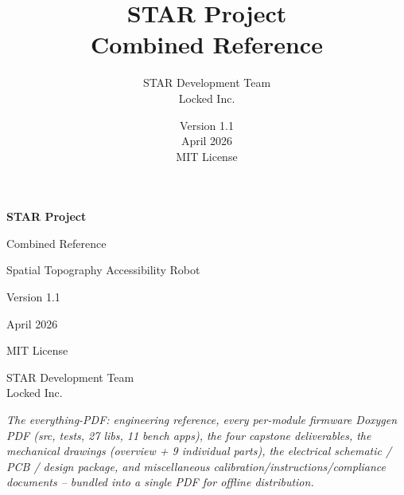 \documentclass[11pt,letterpaper]{article}
\title{\Huge\bfseries STAR Project\\[0.4em]\Large Combined Reference}
\author{STAR Development Team \\ Locked Inc.}
\date{Version 1.1 \\ April 2026 \\ MIT License}
\begin{document}
\begin{titlepage}
\centering
\vspace*{2.5cm}

{\Huge\bfseries STAR Project\par}
\vspace{0.3cm}
{\LARGE Combined Reference\par}
\vspace{0.5cm}
{\large Spatial Topography Accessibility Robot\par}

\vfill

{\large Version 1.1\par}
{\large April 2026\par}
\vspace{0.4cm}
{\large MIT License\par}

\vfill

{\normalsize STAR Development Team\\Locked Inc.\par}
\vspace{0.8cm}

{\small\itshape The everything-PDF: engineering reference, every per-module
firmware Doxygen PDF (src, tests, 27 libs, 11 bench apps), the four capstone
deliverables, the mechanical drawings (overview + 9 individual parts), the
electrical schematic / PCB / design package, and miscellaneous
calibration/instructions/compliance documents -- bundled into a single PDF
for offline distribution.\par}
\end{titlepage}

\tableofcontents
\newpage


\end{document}
